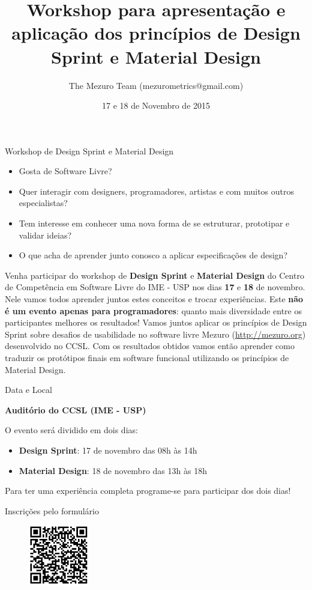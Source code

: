 \documentclass[final]{beamer} %
\title[Design Sprint \& Material Design]{Workshop para apresentação e aplicação dos princípios de Design Sprint e Material Design}
\author[Mezuro]{The Mezuro Team (mezurometrics@gmail.com)}
\institute[CCSL - IME - USP]{Centro de Competência em Software Livre, Instituto de Matemática e Estatística da universidade de São Paulo}
\date{17 e 18 de Novembro de 2015}
\begin{document}
  \begin{frame}{}
    \vfill
    {\veryHuge Workshop de Design Sprint e Material Design}
    \vfill
    \begin{itemize}
      \item {\large Gosta de Software Livre?}
      \item {\large Quer interagir com designers, programadores, artistas e com muitos outros especialistas?}
      \item {\large Tem interesse em conhecer uma nova forma de se estruturar, prototipar e validar ideias?}
      \item {\large O que acha de aprender junto conosco a aplicar especificações de design?}
    \end{itemize}
    \vfill
    {\large Venha participar do workshop de \textbf{Design Sprint} e \textbf{Material Design} do Centro de Competência em Software Livre do IME - USP nos dias \textbf{17} e \textbf{18} de novembro. Nele vamos todos aprender juntos estes conceitos e trocar experiências. Este \textbf{não é um evento apenas para programadores}: quanto mais diversidade entre os participantes melhores os resultados!}
    \vfill
    {\large Vamos juntos aplicar os princípios de Design Sprint sobre desafios de usabilidade no software livre Mezuro (\url{http://mezuro.org}) desenvolvido no CCSL. Com os resultados obtidos vamos então aprender como traduzir os protótipos finais em software funcional utilizando os princípios de Material Design.}
    \vfill
    \begin{block}{\large Data e Local}
      \begin{center}
        \textbf{Auditório do CCSL (IME - USP)}
      \end{center}

        O evento será dividido em dois dias:

        \begin{itemize}
          \item \textbf{Design Sprint}: 17 de novembro das 08h às 14h
          \item \textbf{Material Design}: 18 de novembro das 13h às 18h
        \end{itemize}

        Para ter uma experiência completa programe-se para participar dos dois dias!
    \end{block}
    \vfill
    \begin{block}{\large Inscrições pelo formulário}
      \center
      \begin{figure}[h]
        \includegraphics[height=100px]{design_sprint_form_qr}
      \end{figure}


\end{block}
\end{frame}
\end{document}
